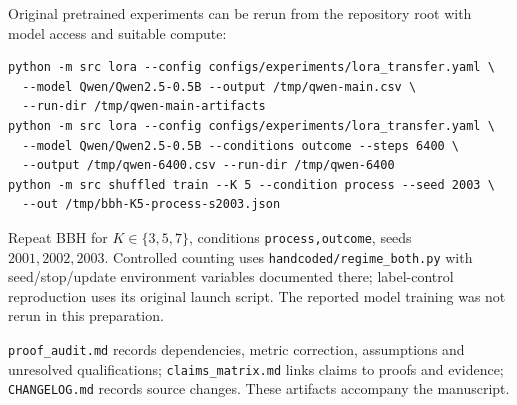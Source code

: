 Original pretrained experiments can be rerun from the repository root with model access and suitable compute:
\begin{verbatim}
python -m src lora --config configs/experiments/lora_transfer.yaml \
  --model Qwen/Qwen2.5-0.5B --output /tmp/qwen-main.csv \
  --run-dir /tmp/qwen-main-artifacts
python -m src lora --config configs/experiments/lora_transfer.yaml \
  --model Qwen/Qwen2.5-0.5B --conditions outcome --steps 6400 \
  --output /tmp/qwen-6400.csv --run-dir /tmp/qwen-6400
python -m src shuffled train --K 5 --condition process --seed 2003 \
  --out /tmp/bbh-K5-process-s2003.json
\end{verbatim}
Repeat BBH for $K\in\{3,5,7\}$, conditions \texttt{process,outcome}, seeds $2001,2002,2003$. Controlled counting uses \texttt{handcoded/regime\_both.py} with seed/stop/update environment variables documented there; label-control reproduction uses its original launch script. The reported model training was not rerun in this preparation.

\texttt{proof\_audit.md} records dependencies, metric correction, assumptions and unresolved qualifications; \texttt{claims\_matrix.md} links claims to proofs and evidence; \texttt{CHANGELOG.md} records source changes. These artifacts accompany the manuscript.
